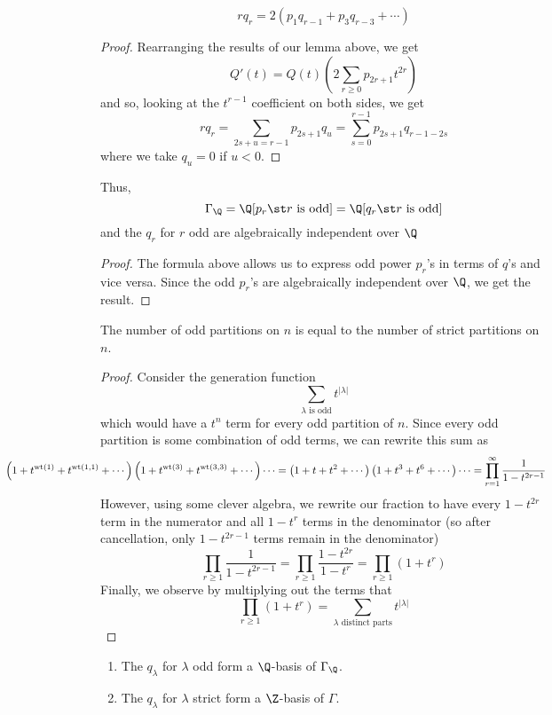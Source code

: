 \documentclass[11pt,leqno,oneside]{amsart}
\numberwithin{thm}{section}
\newcommand{\wt}{\operatorname{wt}}
\begin{document}
\begin{prop}
  \[
    rq_r = 2(p_1 q_{r-1} + p_3 q_{r-3} + \cdots)
  \]
\end{prop}
\begin{proof}
  Rearranging the results of our lemma above, we get \[
    Q'(t) = Q(t)\left(2 \sum_{r \geq 0} p_{2r+1} t^{2r}  \right)
  \]
  and so, looking at the \(t^{r-1}\) coefficient on both sides, we get \[
    r q_r = \sum_{2s+u = r-1} p_{2s+1} q_u = \sum_{s=0}^{r-1} p_{2s+1}
    q_{r-1-2s}
  \]
  where we take \(q_u = 0\) if \(u < 0\).
\end{proof}
\begin{cor}\label{gamma-spanned-by-odd}
  Thus, \[
    \Gamma_\Q = \Q[p_r \st r \text{ is odd}] = \Q[q_r \st r \text{ is odd}]
  \]
  and the \(q_r\) for \(r\) odd are algebraically independent over \(\Q\)
\end{cor}
\begin{proof}
  The formula above allows us to express odd power \(p_r\)'s in terms
  of \(q\)'s and vice versa. Since the odd \(p_r\)'s are algebraically
  independent over \(\Q\), we get the result.
\end{proof}
\begin{lem}
  The number of odd partitions on \(n\) is equal to the number of
  strict partitions on \(n\).
\end{lem}
\begin{proof}
  Consider the generation function \[
    \sum_{\lambda \text{ is odd}} t^{|\lambda|}
  \]
  which would have a \(t^n\) term for every odd partition of
  \(n\). Since every odd partition is some combination of odd terms,
  we can rewrite this sum as \[
    \hspace{-1.25in}\left( 1 + t^{\wt(1)} + t^{\wt(1,1)} + \cdots
    \right)\left( 1 + 
      t^{\wt(3)} + t^{\wt(3,3)} + \cdots \right) \cdots = \left(
      1+t+t^2+\cdots \right)\left( 1+t^3+t^6+\cdots \right) \cdots =
    \prod_{r=1}^\infty \frac{1}{1-t^{2r-1}}
  \]
  However, using some clever algebra, we rewrite our fraction to have
  every \(1-t^{2r}\) term in the numerator and all \(1-t^r\) terms in
  the denominator (so after cancellation, only \(1-t^{2r-1}\) terms
  remain in the denominator) \[
    \prod_{r \geq 1} \frac{1}{1-t^{2r-1}} = \prod_{r \geq 1}
    \frac{1-t^{2r}}{1-t^r} = \prod_{r \geq 1} (1+t^r)
  \]
  Finally, we observe by multiplying out the terms that \[
    \prod_{r \geq 1} (1+t^r) = \sum_{\lambda \text{ distinct parts}}
    t^{|\lambda|} 
  \]
\end{proof}
\begin{prop}
  \begin{enumerate}
  \item The \(q_\lambda\) for \(\lambda\) odd form a \(\Q\)-basis of
    \(\Gamma_\Q\).
  \item The \(q_\lambda\) for \(\lambda\) strict form a \(\Z\)-basis
    of \(\Gamma\).
  \end{enumerate}
\end{prop}
\end{document}
